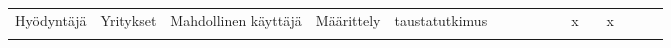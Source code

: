 \begin{landscape}
\begin{table}[]
{\begin{tabular}{llllllllllllllll}
Hyödyntäjä                                                                                                                                         & Yritykset                                                                                                           & Mahdollinen käyttäjä                                                                                             & Määrittely                                                                                     & taustatutkimus                                                                     &                                  &                                   &                                        &                                                                                         &                                      & x                                                     &                                      & x                                                                                                  &                                     &                                   &                                 \\
                                                                                                                                                   &                                                                                                                     &                                                                                                                  &                                                                                                &                                                                                    &                                  &                                   &                                        &                                                                                         &                                      &                                                       &                                      &                                                                                                    &                                     &                                   &                                 \\

\end{tabular}}
\end{table}
\end{landscape}

